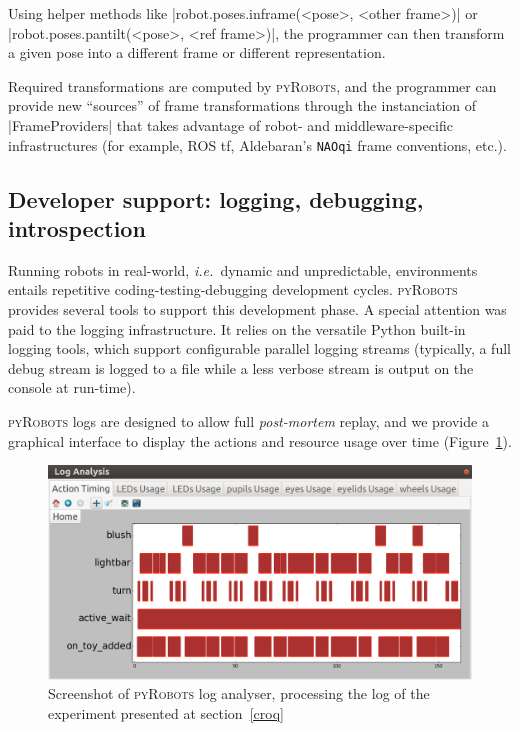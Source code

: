 \documentclass[a4paper, 10pt, conference]{ieeeconf}      %
\newcommand{\ie}{{\textit{i.e.\ }}}
\newcommand{\pyRobots}{\textsc{pyRobots}}
\begin{document}
Using helper methods like \python|robot.poses.inframe(<pose>, <other frame>)| or
\python|robot.poses.pantilt(<pose>, <ref frame>)|, the programmer can then
transform a given pose into a different frame or different representation.

Required transformations are computed by \pyRobots{}, and the programmer can
provide new ``sources'' of frame transformations through the instanciation of
\python|FrameProviders| that takes advantage of robot- and middleware-specific
infrastructures (for example, ROS {\sc tf}, Aldebaran's {\tt NAOqi} frame
conventions, etc.).

\subsection{Developer support: logging, debugging, introspection}
\label{}

Running robots in real-world, \ie dynamic and unpredictable, environments
entails repetitive coding-testing-debugging development cycles. \pyRobots{}
provides several tools to support this development phase. A special attention
was paid to the logging infrastructure. It relies on the versatile Python
built-in logging tools, which support configurable parallel logging streams
(typically, a full debug stream is logged to a file while a less verbose stream
is output on the console at run-time).

\pyRobots{} logs are designed to allow full \emph{post-mortem} replay, and we
provide a graphical interface to display the actions and resource usage over
time (Figure~\ref{log_view}).

\begin{figure}
        \centering
        \includegraphics[width=0.9\columnwidth]{log}
        \caption{Screenshot of \pyRobots{} log analyser, processing the log of the
        experiment presented at section~\ref{croq}}
        \label{log_view}
\end{figure}
\end{document}

